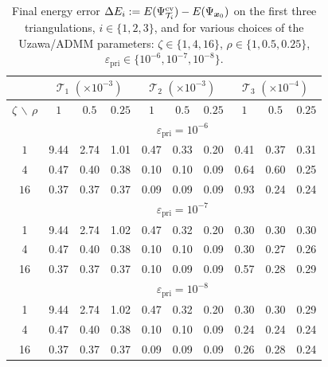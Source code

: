 \documentclass[a4paper,11pt]{article}
\theoremstyle{definition}
\theoremstyle{remark}
\numberwithin{equation}{section}
\newcommand{\bx}{{\boldsymbol x}}
\begin{document}
\begin{table}[htb]
\centering
\begin{tabular}{|c|ccc|ccc|ccc|}
\hline
&\multicolumn{3}{|c|}{$\mathcal{T}_1 \,\, (\times 10^{-3})$}&\multicolumn{3}{|c|}{$\mathcal{T}_2\,\, (\times 10^{-3})$} &\multicolumn{3}{|c|}{$\mathcal{T}_3\,\, (\times 10^{-4})$}\\ \hline
$\zeta\, \backslash\,\rho $ & $1$ &  $0.5$ &  $0.25$ & $1$ &  $0.5$ &  $0.25$ & $1$ &  $0.5$ &  $0.25$\\
\hline
&\multicolumn{9}{|c|}{$\varepsilon_{\text{pri}}=10^{-6}$}\\ \hline
$1$ &9.44 &  2.74 &   1.01&0.47 & 0.33 & 0.20  &0.41& 0.37 & 0.31\\
$4$ &0.47 &  0.40 &   0.38& 0.10 & 0.10 & 0.09 &0.64& 0.60 & 0.25\\
$16$ & 0.37 & 0.37 & 0.37 & 0.09 & 0.09 & 0.09 &0.93& 0.24 & 0.24\\
\hline
&\multicolumn{9}{|c|}{$\varepsilon_{\text{pri}}=10^{-7}$}\\ \hline
1& 9.44 & 2.74 & 1.02& 0.47 & 0.32 & 0.20 &0.30 & 0.30 & 0.30  \\
4& 0.47 & 0.40 & 0.38& 0.10 & 0.10 & 0.09 &0.30 & 0.27 & 0.26\\
16& 0.37 & 0.37&0.37 & 0.10 & 0.09 & 0.09 &0.57 & 0.28 & 0.29 \\
\hline  
&\multicolumn{9}{|c|}{$\varepsilon_{\text{pri}}=10^{-8}$}\\
\hline
1& 9.44 & 2.74 & 1.02 &0.47 &0.32 & 0.20 &0.30 & 0.30 & 0.29  \\
4& 0.47 & 0.40 & 0.38 &0.10 &0.10 & 0.09 & 0.24 & 0.24 & 0.24   \\
16& 0.37 & 0.37 & 0.37&0.09 &0.09 & 0.09 & 0.26 & 0.28 & 0.24  \\
\hline
\end{tabular}
\caption{Final energy error $\Delta E_{i} := E(\Psi^{\rm cv}_{\mathcal{T}_i}) - E(\Psi_{\bx_0})$ on the first three triangulations, $i\in\{1,2,3\}$, and for various choices of the Uzawa/ADMM parameters: $\zeta\in\{1,4,16\}$, $\rho\in\{1,0.5,0.25\}$, $\varepsilon_{\text{pri}} \in \{10^{-6},10^{-7},10^{-8}\}$.}
\label{Tab:en-err-Ex1}
\end{table}
\end{document}
